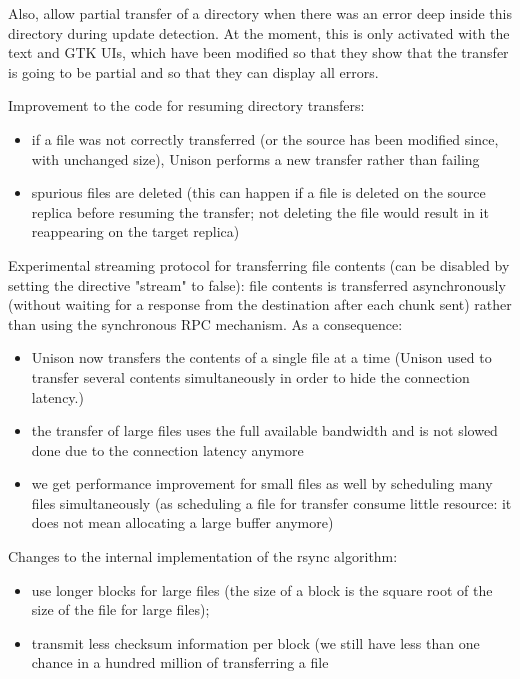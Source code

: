 \begin{changesfromversion}{2.32}
  Also, allow partial transfer of a directory when there was an error deep
  inside this directory during update detection.  At the moment, this
  is only activated with the text and GTK UIs, which have been
  modified so that they show that the transfer is going to be partial
  and so that they can display all errors.
\item Improvement to the code for resuming directory transfers:
\begin{itemize}
\item
   if a file was not correctly transferred (or the source has been
    modified since, with unchanged size), Unison performs a new
    transfer rather than failing
  \item spurious files are deleted (this can happen if a file is deleted
    on the source replica before resuming the transfer; not deleting
    the file would result in it reappearing on the target replica)
\end{itemize}
\item Experimental streaming protocol for transferring file contents (can
  be disabled by setting the directive "stream" to false): file
  contents is transferred asynchronously (without waiting for a response
  from the destination after each chunk sent) rather than using the
  synchronous RPC mechanism.  As a consequence:
  \begin{itemize}
  \item
   Unison now transfers the contents of a single file at a time
    (Unison used to transfer several contents simultaneously in order
    to hide the connection latency.)
  \item the transfer of large files uses the full available bandwidth
    and is not slowed done due to the connection latency anymore
  \item we get performance improvement for small files as well by
    scheduling many files simultaneously (as scheduling a file for
    transfer consume little resource: it does not mean allocating a
    large buffer anymore)
  \end{itemize}
\item Changes to the internal implementation of the rsync algorithm:
\begin{itemize}
\item
  use longer blocks for large files (the size of a block is the
    square root of the size of the file for large files);
  \item transmit less checksum information per block (we still have less
    than one chance in a hundred million of transferring a file

\end{itemize}
\end{changesfromversion}
